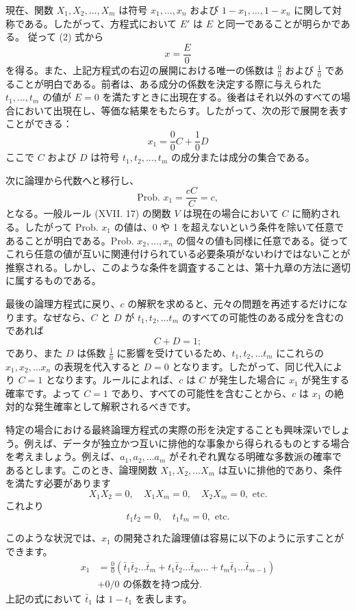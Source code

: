 \documentclass[a4paper,11pt,openany]{ltjsbook}
\begin{document}
現在、関数 $X_1, X_2, \dotsc, X_m$ は符号 $x_1, \dotsc, x_n$ および $1-x_1, \dotsc, 1-x_n$ に関して対称である。したがって、方程式において $E'$ は $E$ と同一であることが明らかである。
従って (2) 式から
\[
x = \frac{E}{0}
\]
を得る。また、上記方程式の右辺の展開における唯一の係数は $\frac{0}{0}$ および $\frac{1}{0}$ であることが明白である。前者は、ある成分の係数を決定する際に与えられた $t_1, \dotsc, t_m$ の値が $E = 0$ を満たすときに出現在する。後者はそれ以外のすべての場合において出現在し、等価な結果をもたらす。したがって、次の形で展開を表すことができる：
\[
x_1 = \frac{0}{0}C + \frac{1}{0}D    \tag{3}
\]
ここで $C$ および $D$ は符号 $t_1, t_2, \dotsc, t_m$ の成分または成分の集合である。

次に論理から代数へと移行し、
\[
\text{Prob. }x_1 = \frac{cC}{C} = c,
\]
となる。一般ルール (XVII. 17) の関数 $V$ は現在の場合において $C$ に簡約される。したがって Prob. $x_1$ の値は、0 や 1 を超えないという条件を除いて任意であることが明白である。Prob. $x_2, \dotsc, x_n$ の個々の値も同様に任意である。従ってこれら任意の値が互いに関連付けられている必要条項がないわけではないことが推察される。しかし、このような条件を調査することは、第十九章の方法に適切に属するものである。

最後の論理方程式に戻り、$c$ の解釈を求めると、元々の問題を再述するだけになります。なぜなら、$C$ と $D$ が $t_1, t_2, \dotsc t_m$ のすべての可能性のある成分を含むのであれば
\[
  C + D = 1;
\]
であり、また $D$ は係数 $\frac{1}{0}$ に影響を受けているため、$t_1, t_2, \dotsc t_m$ にこれらの $x_1, x_2, \dotsc x_n$ の表現を代入すると $D = 0$ となります。したがって、同じ代入により $C = 1$ となります。ルールによれば、$c$ は $C$ が発生した場合に $x_1$ が発生する確率です。よって $C = 1$ であり、すべての可能性を含むことから、$c$ は $x_1$ の絶対的な発生確率として解釈されるべきです。

特定の場合における最終論理方程式の実際の形を決定することも興味深いでしょう。例えば、データが独立かつ互いに排他的な事象から得られるものとする場合を考えましょう。例えば、$a_1, a_2, \dotsc a_m$ がそれぞれ異なる明確な多数派の確率であるとします。このとき、論理関数 $X_1, X_2, \dotsc X_m$ は互いに排他的であり、条件を満たす必要があります
\[
  X_1 X_2 = 0,\quad X_1 X_m = 0,\quad X_2 X_m = 0, \text{ etc.}
\]
これより
\[
  t_1 t_2 = 0,\quad t_1 t_m = 0, \text{ etc.}
\]

このような状況では、$x_1$ の開発された論理値は容易に以下のように示すことができます。
\begin{equation*}\begin{split}
x_1 &= \frac{0}{0}(\bar{t}_1 \bar{t}_2 \dotsc \bar{t}_m + t_1 \bar{t}_2 \dotsc \bar{t}_m \dotsc + t_m \bar{t}_1\dotsc \bar{t}_{m-1}) \\
&+ 0/0 \text{ の係数を持つ成分}.
\end{split}\end{equation*}
上記の式において $\bar{t}_1$ は $1 - t_1$ を表します。
\end{document}
